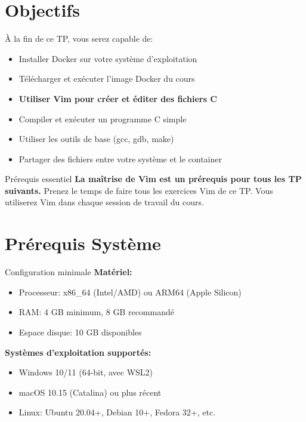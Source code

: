 \documentclass[10pt,a4paper]{article}
\begin{document}
\section*{Objectifs}

À la fin de ce TP, vous serez capable de:
\begin{itemize}
\item Installer Docker sur votre système d'exploitation
\item Télécharger et exécuter l'image Docker du cours
\item \textbf{Utiliser Vim pour créer et éditer des fichiers C}
\item Compiler et exécuter un programme C simple
\item Utiliser les outils de base (gcc, gdb, make)
\item Partager des fichiers entre votre système et le container
\end{itemize}

\begin{warningbox}{Prérequis essentiel}
\textbf{La maîtrise de Vim est un prérequis pour tous les TP suivants.} Prenez le temps de faire tous les exercices Vim de ce TP. Vous utiliserez Vim dans chaque session de travail du cours.
\end{warningbox}

\section{Prérequis Système}

\begin{techbox}{Configuration minimale}
\textbf{Matériel:}
\begin{itemize}
\item Processeur: x86\_64 (Intel/AMD) ou ARM64 (Apple Silicon)
\item RAM: 4 GB minimum, 8 GB recommandé
\item Espace disque: 10 GB disponibles
\end{itemize}

\textbf{Systèmes d'exploitation supportés:}
\begin{itemize}
\item Windows 10/11 (64-bit, avec WSL2)
\item macOS 10.15 (Catalina) ou plus récent
\item Linux: Ubuntu 20.04+, Debian 10+, Fedora 32+, etc.
\end{itemize}
\end{techbox}
\end{document}
